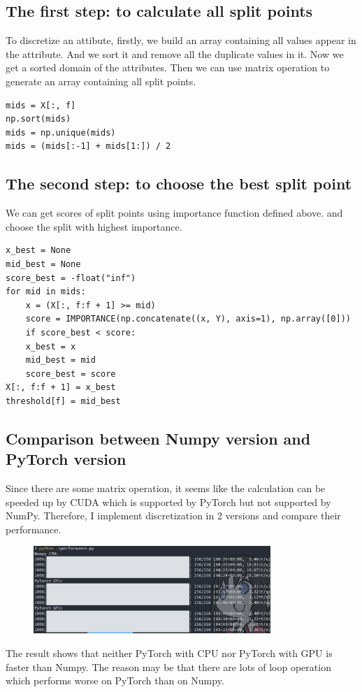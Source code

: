 \documentclass[UTF8, a4paper, 11pt]{article}
\begin{document}
\subsection{The first step: to calculate all split points}
To discretize an attibute, firstly, we build an array containing all values appear in the attribute.
And we sort it and remove all the duplicate values in it.
Now we get a sorted domain of the attributes.
Then we can use matrix operation to generate an array containing all split points.
\begin{lstlisting}
mids = X[:, f]
np.sort(mids)
mids = np.unique(mids)
mids = (mids[:-1] + mids[1:]) / 2
\end{lstlisting}
\subsection{The second step: to choose the best split point}
We can get scores of split points using importance function defined above. and choose the split with highest importance.
\begin{lstlisting}
x_best = None
mid_best = None
score_best = -float("inf")
for mid in mids:
    x = (X[:, f:f + 1] >= mid)
    score = IMPORTANCE(np.concatenate((x, Y), axis=1), np.array([0]))
    if score_best < score:
    x_best = x
    mid_best = mid
    score_best = score
X[:, f:f + 1] = x_best
threshold[f] = mid_best
\end{lstlisting}
\subsection{Comparison between Numpy version and PyTorch version}
Since there are some matrix operation, it seems like the calculation can be speeded up by CUDA which is supported by PyTorch but not supported by NumPy.
Therefore, I implement discretization in 2 versions and compare their performance.
\begin{figure}[H]
    \centering
    \includegraphics[width=0.8\textwidth]{CPU_GPU.png}
\end{figure}
The result shows that neither PyTorch with CPU nor PyTorch with GPU is faster than Numpy.
The reason may be that there are lots of loop operation which performs worse on PyTorch than on Numpy.
\end{document}
